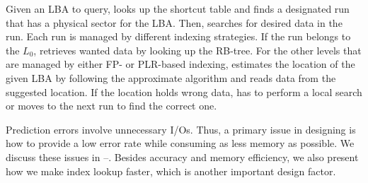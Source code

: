 Given an LBA to query, \ours{} looks up the shortcut table
and finds a designated run that has a physical sector for the LBA.
Then, \ours{} searches for desired data in the run.
Each run is managed by different indexing strategies.
If the run belongs to the $L_0$, 
\ours{} retrieves wanted data
by looking up the RB-tree.
For the other levels that are managed by either FP- or PLR-based
indexing, \ours{} estimates the
location of the given LBA by following the approximate algorithm
and reads data from the suggested location.
If the location holds wrong data, 
\ours{} has to perform a local search
or moves to the next run to find the correct one.  

Prediction errors involve unnecessary I/Os.
Thus, a primary issue in designing \ours{} is how to
provide a low error rate while consuming as less memory as possible.
We discuss these issues in --.
Besides accuracy and memory efficiency, 
we also present how we make index lookup faster,
which is another important design factor.
